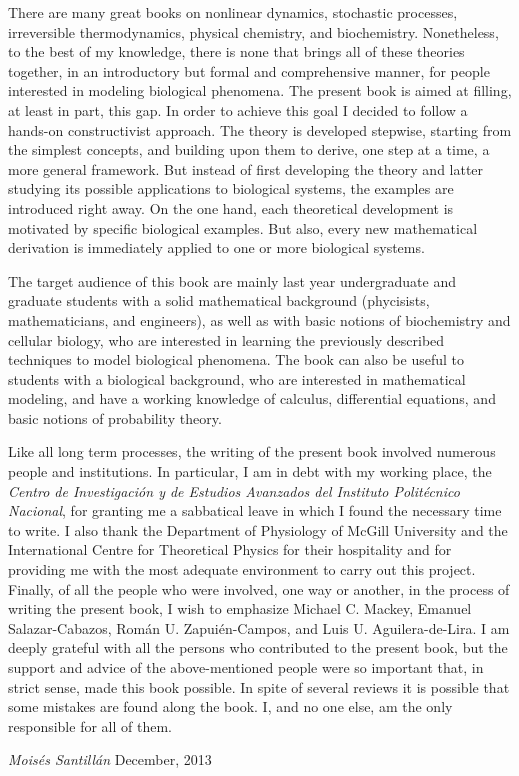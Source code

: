 There are many great books on nonlinear dynamics, stochastic processes, irreversible thermodynamics, physical chemistry, and biochemistry. Nonetheless, to the best of my knowledge, there is none that brings all of these theories together, in an introductory but formal and comprehensive manner, for people interested in modeling biological phenomena. The present book is aimed at filling, at least in part, this gap. In order to achieve this goal I decided to follow a hands-on constructivist approach. The theory is developed stepwise, starting from the simplest concepts, and building upon them to derive, one step at a time, a more general framework. But instead of first developing the theory and latter studying its possible applications to biological systems, the examples are introduced right away. On the one hand, each theoretical development is motivated by specific biological examples. But also, every new mathematical derivation is immediately applied to one or more biological systems.

The target audience of this book are mainly last year undergraduate and graduate students with a solid mathematical background (phycisists, mathematicians, and engineers), as well as with basic notions of biochemistry and cellular biology, who are interested in learning the previously described techniques to model biological phenomena. The book can also be useful to students with a biological background, who are interested in mathematical modeling, and have a working knowledge of calculus, differential equations, and basic notions of probability theory.


Like all long term processes, the writing of the present book involved numerous people and institutions. In particular, I am in debt with my working place, the \emph{Centro de Investigaci\'on y de Estudios Avanzados del Instituto Polit\'ecnico Nacional}, for granting me a sabbatical leave in which I found the necessary time to write.
 I also thank the Department of Physiology of McGill University and the International Centre for Theoretical Physics for their hospitality and for providing me with the most adequate environment to carry out this project. Finally, of all the people who were involved, one way or another, in the process of writing the present book, I wish to emphasize Michael C. Mackey, Emanuel Salazar-Cabazos, Rom\'an U. Zapui\'en-Campos, and Luis U. Aguilera-de-Lira. I am deeply grateful with all the persons who contributed to the present book, but the support and advice of the above-mentioned people were so important that, in strict sense, made this book possible. In spite of several reviews it is possible that some mistakes are found along the book. I, and no one else, am the only responsible for all of them.

\vspace{\baselineskip}
\begin{flushright}\noindent
{\it Mois\'es Santill\'an\hfill } December, 2013\\
\end{flushright}


